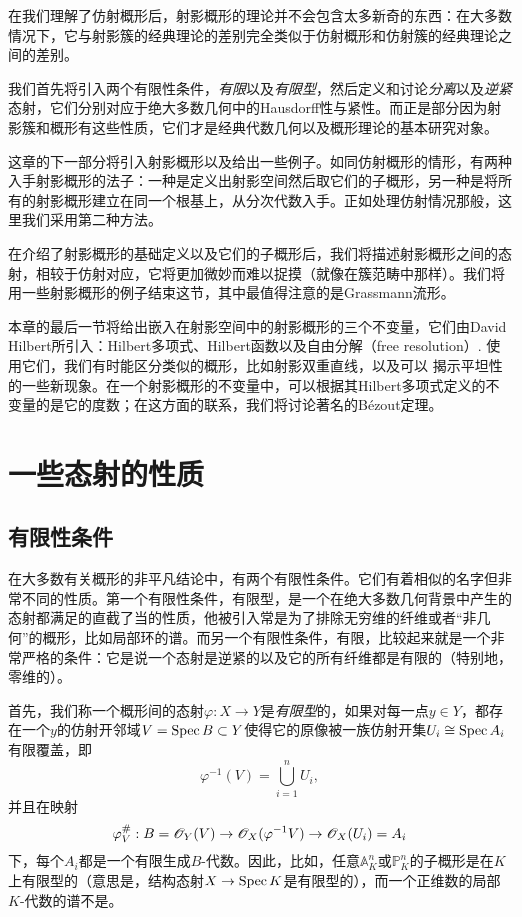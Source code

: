 在我们理解了仿射概形后，射影概形的理论并不会包含太多新奇的东西：在大多数情况下，它与射影簇的经典理论的差别完全类似于仿射概形和仿射簇的经典理论之间的差别。

我们首先将引入两个有限性条件，\textit{有限}以及\textit{有限型}，然后定义和讨论\textit{分离}以及\textit{逆紧}态射，它们分别对应于绝大多数几何中的Hausdorff性与紧性。而正是部分因为射影簇和概形有这些性质，它们才是经典代数几何以及概形理论的基本研究对象。

这章的下一部分将引入射影概形以及给出一些例子。如同仿射概形的情形，有两种入手射影概形的法子：一种是定义出射影空间然后取它们的子概形，另一种是将所有的射影概形建立在同一个根基上，从分次代数入手。正如处理仿射情况那般，这里我们采用第二种方法。

在介绍了射影概形的基础定义以及它们的子概形后，我们将描述射影概形之间的态射，相较于仿射对应，它将更加微妙而难以捉摸（就像在簇范畴中那样）。我们将用一些射影概形的例子结束这节，其中最值得注意的是Grassmann流形。

本章的最后一节将给出嵌入在射影空间中的射影概形的三个不变量，它们由David Hilbert所引入：Hilbert多项式、Hilbert函数以及自由分解（free resolution）. 使用它们，我们有时能区分类似的概形，比如射影双重直线，以及可以
揭示平坦性的一些新现象。在一个射影概形的不变量中，可以根据其Hilbert多项式定义的不变量的是它的度数；在这方面的联系，我们将讨论著名的B\'{e}zout定理。

\section{一些态射的性质}\label{s:3.1}

\subsection{有限性条件}\label{s:3.1.1}

在大多数有关概形的非平凡结论中，有两个有限性条件。它们有着相似的名字但非常不同的性质。第一个有限性条件，有限型，是一个在绝大多数几何背景中产生的态射都满足的直截了当的性质，他被引入常是为了排除无穷维的纤维或者“非几何”的概形，比如局部环的谱。而另一个有限性条件，有限，比较起来就是一个非常严格的条件：它是说一个态射是逆紧的以及它的所有纤维都是有限的（特别地，零维的）。

首先，我们称一个概形间的态射$\varphi:X\to Y$是\textit{有限型}的，如果对每一点$y\in Y$，都存在一个$y$的仿射开邻域$V=\operatorname{Spec} B\subset Y$使得它的原像被一族仿射开集$U_i\cong \operatorname{Spec} A_i$有限覆盖，即
\[
	\varphi^{-1}(V)=\bigcup_{i=1}^n U_i,
\]
并且在映射
\[
	\varphi_V^\#:B=\mathscr{O}_Y(V)\to \mathscr{O}_X (\varphi^{-1}V)\to \mathscr{O}_X(U_i)=A_i
\]
下，每个$A_i$都是一个有限生成$B$\hyp 代数。因此，比如，任意$\mathbb{A}_K^n$或$\mathbb{P}_K^n$的子概形是在$K$上有限型的（意思是，结构态射$X\to \operatorname{Spec} K$是有限型的），而一个正维数的局部$K$\hyp 代数的谱不是。

